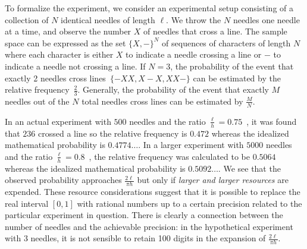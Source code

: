 \documentclass{article}
\theoremstyle{remark}
\begin{document}
To formalize the experiment, we consider an experimental setup
consisting of a collection of $N$ identical needles of length
$\ell$. We throw the $N$ needles one needle at a time, and observe the number
$X$ of needles that cross a line. The sample space can be expressed as the set
$\{X,-\}^N$
of sequences of characters of length $N$ where each character is
either $X$ to indicate a needle crossing a line or $-$ to indicate a
needle not crossing a line. If $N=3$, the probability of the event that exactly
2 needles cross lines~$\{-XX,X{-}X,XX-\}$ can be 
estimated by the relative frequency~$\frac{2}{3}$. Generally, the probability of
the event that exactly $M$ needles out of the $N$ total needles cross lines can
be estimated by $\frac{M}{N}$.

In an actual experiment with $500$ needles and the ratio
$\frac{\ell}{h}=0.75$~\cite{Hall1873}, it was found that $236$ crossed
a line so the relative frequency is $0.472$ whereas the idealized
mathematical probability is $0.4774\ldots$. In a larger experiment
with $5000$ needles and the ratio
$\frac{\ell}{h}=0.8$~\cite{Uspensky1937}, the relative frequency was
calculated to be $0.5064$ whereas the idealized mathematical
probability is $0.5092\ldots$. We see that the observed probability
approaches $\frac{2\ell}{\pi h}$ but only if \emph{larger and larger
  resources} are expended. These resource considerations suggest that
it is possible to replace the real interval $[0,1]$ with rational
numbers up to a certain precision related to the particular experiment
in question.  There is clearly a connection between the number of
needles and the achievable precision: in the hypothetical experiment
with 3 needles, it is not sensible to retain 100 digits in the
expansion of $\frac{2\ell}{\pi h}$.
\end{document}
